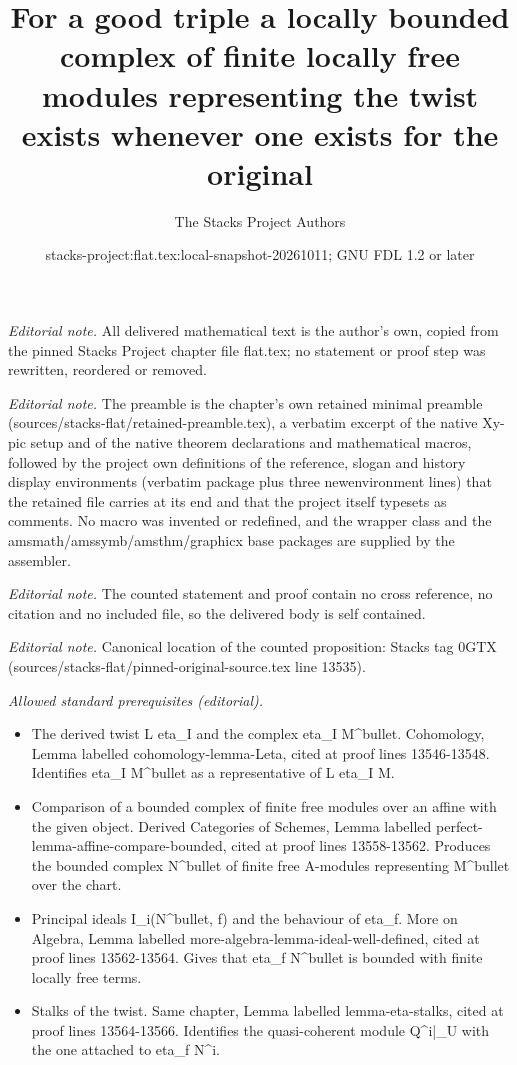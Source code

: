 \documentclass[10pt,a4paper]{amsart}
\title{For a good triple a locally bounded complex of finite locally free modules representing the twist exists whenever one exists for the original}
\author{The Stacks Project Authors}
\date{stacks-project:flat.tex:local-snapshot-20261011; GNU FDL 1.2 or later}
\theoremstyle{plain}
\theoremstyle{definition}
\theoremstyle{remark}
\numberwithin{equation}{subsection}
\begin{document}
\maketitle
\noindent\textit{Editorial note.} All delivered mathematical text is the author's own, copied from the pinned Stacks Project chapter file flat.tex; no statement or proof step was rewritten, reordered or removed.\par\medskip
\noindent\textit{Editorial note.} The preamble is the chapter's own retained minimal preamble (sources/stacks-flat/retained-preamble.tex), a verbatim excerpt of the native Xy-pic setup and of the native theorem declarations and mathematical macros, followed by the project own definitions of the reference, slogan and history display environments (verbatim package plus three newenvironment lines) that the retained file carries at its end and that the project itself typesets as comments. No macro was invented or redefined, and the wrapper class and the amsmath/amssymb/amsthm/graphicx base packages are supplied by the assembler.\par\medskip
\noindent\textit{Editorial note.} The counted statement and proof contain no cross reference, no citation and no included file, so the delivered body is self contained.\par\medskip
\noindent\textit{Editorial note.} Canonical location of the counted proposition: Stacks tag 0GTX (sources/stacks-flat/pinned-original-source.tex line 13535).\par\medskip
\noindent\textit{Allowed standard prerequisites (editorial).}\begin{itemize}
\item The derived twist L eta\_I and the complex eta\_I M\textasciicircum{}bullet. Cohomology, Lemma labelled cohomology-lemma-Leta, cited at proof lines 13546-13548. Identifies eta\_I M\textasciicircum{}bullet as a representative of L eta\_I M.
\item Comparison of a bounded complex of finite free modules over an affine with the given object. Derived Categories of Schemes, Lemma labelled perfect-lemma-affine-compare-bounded, cited at proof lines 13558-13562. Produces the bounded complex N\textasciicircum{}bullet of finite free A-modules representing M\textasciicircum{}bullet over the chart.
\item Principal ideals I\_i(N\textasciicircum{}bullet, f) and the behaviour of eta\_f. More on Algebra, Lemma labelled more-algebra-lemma-ideal-well-defined, cited at proof lines 13562-13564. Gives that eta\_f N\textasciicircum{}bullet is bounded with finite locally free terms.
\item Stalks of the twist. Same chapter, Lemma labelled lemma-eta-stalks, cited at proof lines 13564-13566. Identifies the quasi-coherent module Q\textasciicircum{}i|\_U with the one attached to eta\_f N\textasciicircum{}i.
\end{itemize}\medskip
\end{document}
